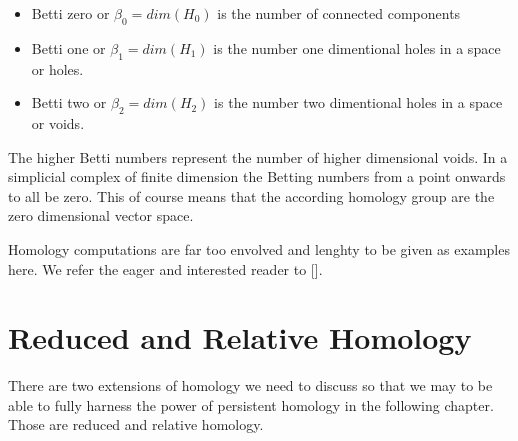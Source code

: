 \begin{itemize}
    \item Betti zero or $\beta_0 = dim(H_0)$ is the number of connected components
    \item Betti one  or $\beta_1 = dim(H_1)$ is the number one dimentional holes in a space or holes.
    \item Betti two  or $\beta_2 = dim(H_2)$ is the number two dimentional holes in a space or voids.
\end{itemize}


The higher Betti numbers represent the number of higher dimensional voids. In a simplicial complex of finite dimension the Betting numbers from a point onwards to all be zero. This of course means that the according homology group are the zero dimensional vector space.

Homology computations are far too envolved and lenghty to be given as examples here. We refer the eager and interested reader to [].





\section{Reduced and Relative Homology}

There are two extensions of homology we need to discuss so that we may to be able to fully harness the power of persistent homology in the following chapter. Those are reduced and relative homology.

